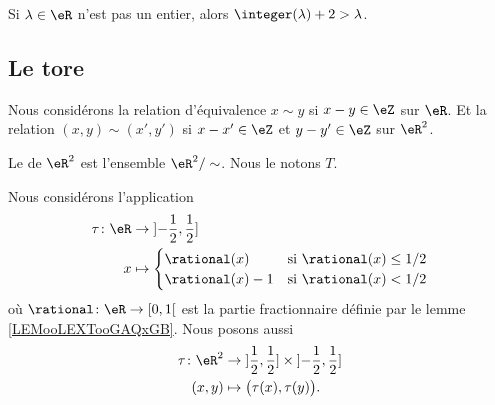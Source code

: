 \begin{lemma}       \label{LEMooMMSAooFiRkQd}
	Si \( \lambda\in \eR\) n'est pas un entier, alors \( \integer(\lambda)+2>\lambda\).
\end{lemma}

\subsection{Le tore}


\begin{definition}	\label{DEFooRWLLooHkdFDN}
	Nous considérons la relation d'équivalence \( x\sim y\) si \( x-y\in \eZ\) sur \( \eR\). Et la relation \( (x,y)\sim(x',y')\) si \( x-x'\in \eZ\) et \( y-y'\in \eZ\) sur \( \eR^2\).
\end{definition}


\begin{definition}	\label{DEFooTSSTooOFPxzu}
	Le  de \( \eR^2\) est l'ensemble \( \eR^2/\sim\). Nous le notons \( T\).
\end{definition}

Nous considérons l'application
\begin{equation}
	\begin{aligned}
		\tau\colon \eR & \to \mathopen] -\frac{ 1 }{2},\frac{ 1 }{2}\mathclose]   \\
		x              & \mapsto \begin{cases}
			                         \rational(x)   & \text{si } \rational(x)\leq 1/2 \\
			                         \rational(x)-1 & \text{si }\rational(x)<1/2
		                         \end{cases}
	\end{aligned}
\end{equation}
où \(\rational \colon \eR\to \mathopen[ 0,1\mathclose[  \) est la partie fractionnaire définie par le lemme \ref{LEMooLEXTooGAQxGB}. Nous posons aussi
\begin{equation}
	\begin{aligned}
		\tau\colon \eR^2 & \to \mathopen] \frac{ 1 }{2},\frac{ 1 }{2}\mathclose]\times \mathopen] -\frac{ 1 }{2},\frac{ 1 }{2}\mathclose] \\
		(x,y)            & \mapsto    \big( \tau(x),\tau(y) \big).
	\end{aligned}
\end{equation}

